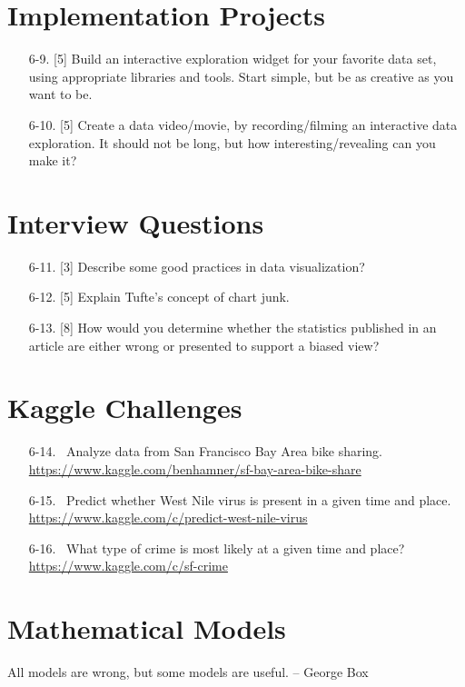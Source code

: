 \documentclass[10pt]{article}
\begin{document}
\section{Implementation Projects}
\begin{enumerate}
  \item[6-9.] [5] Build an interactive exploration widget for your favorite data set, using appropriate libraries and tools. Start simple, but be as creative as you want to be.
  \item[6-10.] [5] Create a data video/movie, by recording/filming an interactive data exploration. It should not be long, but how interesting/revealing can you make it?
\end{enumerate}

\section{Interview Questions}
\begin{enumerate}
  \item[6-11.] [3] Describe some good practices in data visualization?
  \item[6-12.] [5] Explain Tufte's concept of chart junk.
  \item[6-13.] [8] How would you determine whether the statistics published in an article are either wrong or presented to support a biased view?
\end{enumerate}

\section{Kaggle Challenges}
\begin{enumerate}
  \item[6-14.]\ Analyze data from San Francisco Bay Area bike sharing. \url{https://www.kaggle.com/benhamner/sf-bay-area-bike-share}
  \item[6-15.]\ Predict whether West Nile virus is present in a given time and place. \url{https://www.kaggle.com/c/predict-west-nile-virus}
  \item[6-16.]\ What type of crime is most likely at a given time and place? \url{https://www.kaggle.com/c/sf-crime}
\end{enumerate}

\section{Mathematical Models}
\begin{displayquote}
All models are wrong, but some models are useful. -- George Box
\end{displayquote}
\end{document}
